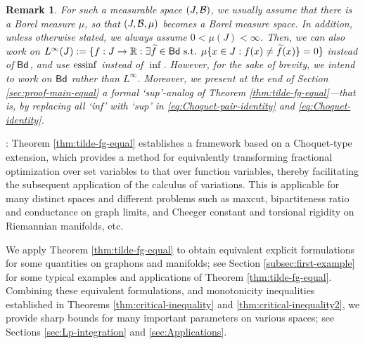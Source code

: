 \documentclass[12pt,a4paper]{article}
\newtheorem{remark}[theorem]{Remark}
\newenvironment{proof}{\medskip\noindent{\bf Proof. }}{\hfill$\square$\medskip}
\begin{document}
\begin{remark}
For such a measurable space $(J,\mathcal{B})$, we usually assume that there is a Borel measure $\mu$, so that  $(J,\mathcal{B},\mu)$ becomes a Borel measure space. In addition, unless otherwise stated, we always assume $0<\mu(J)<\infty$. 
Then, we can also work on $L^\infty(J) :=\{f:J\to\mathbb{R}: \exists \widetilde{f}\in{\sf Bd}\text{ s.t. }\mu\{x\in J:f(x)\ne \widetilde{f}(x)\}=0\}$ instead of ${\sf Bd}$, and use $\mathop{\mathrm{essinf}}$ instead of $\inf$. %
However, for the sake of brevity, we intend to work on ${\sf Bd}$ rather than $L^\infty$. 
Moreover, we present at the end of Section \ref{sec:proof-main-equal} a formal `sup'-analog of Theorem \ref{thm:tilde-fg-equal}—that is, by  replacing all `inf' with `sup' in \eqref{eq:Choquet-pair-identity} and \eqref{eq:Choquet-identity}.  
\end{remark}

: 
Theorem \ref{thm:tilde-fg-equal} establishes a framework based on a Choquet-type extension, which provides a method for equivalently transforming fractional optimization over set variables to that over function variables, thereby facilitating the subsequent application of the calculus of variations. 
This is applicable for many distinct spaces and different problems such as maxcut, bipartiteness ratio and conductance on graph limits, and Cheeger constant and torsional rigidity on Riemannian manifolds, etc. 


We apply Theorem \ref{thm:tilde-fg-equal} to obtain equivalent explicit formulations for some quantities on graphons and manifolds; see Section \ref{subsec:first-example} for some typical examples and applications of Theorem \ref{thm:tilde-fg-equal}. Combining these equivalent formulations, and monotonicity inequalities %
established in Theorems \ref{thm:critical-inequality} and \ref{thm:critical-inequality2}, we provide sharp bounds for many important parameters on various spaces; see Sections \ref{sec:Lp-integration} and \ref{sec:Applications}. 
\end{document}
